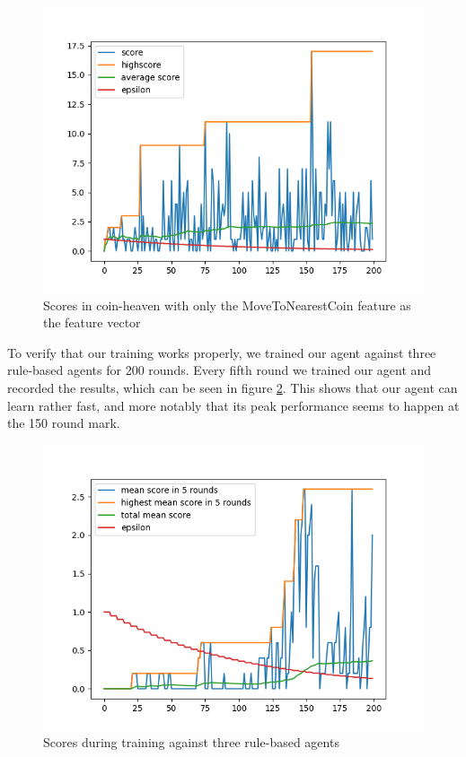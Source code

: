 \documentclass{article}
\begin{document}
\begin{figure}[h]
    \centering
    \includegraphics[scale=0.6]{plots/coin_heaven.png}
    \caption{Scores in coin-heaven with only the MoveToNearestCoin feature as the feature vector}
    \label{fig:coin_heaven_only_nearest_coin}
\end{figure}

To verify that our training works properly, we trained our agent against three rule-based agents for 200 rounds. Every fifth round we trained our agent and recorded the results, which can be seen in figure \ref{fig:scores}. This shows that our agent can learn rather fast, and more notably that its peak performance seems to happen at the 150 round mark.

\begin{figure} [h]
    \centering
    \includegraphics[scale=0.6]{plots/scores.png}
    \caption{Scores during training against three rule-based agents}
    \label{fig:scores}
\end{figure}
\end{document}
